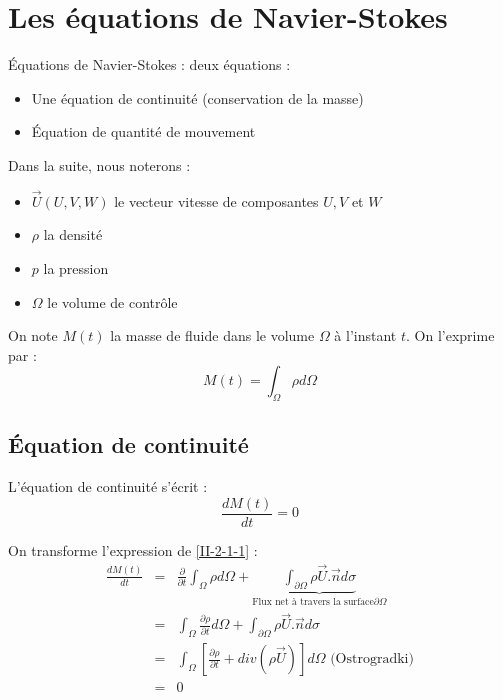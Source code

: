 \section{Les équations de Navier-Stokes}
Équations de Navier-Stokes : deux équations :
\begin{itemize}
	\item Une équation de continuité (conservation de la masse)
	\item Équation de quantité de mouvement
\end{itemize}

\bigskip
Dans la suite, nous noterons :
\begin{itemize}
	\item $\overrightarrow{U}(U,V,W)$ le vecteur vitesse de composantes $U, V$ et $W$
	\item $\rho$ la densité
	\item $p$ la pression
	\item $\Omega$ le volume de contrôle
\end{itemize}

\bigskip
On note $M(t)$ la masse de fluide dans le volume $\Omega$ à l'instant $t$. On l'exprime par :
	\begin{equation} \label{II-2} M(t)=\int_{\Omega} \rho d\Omega \end{equation}

	\subsection{Équation de continuité}
L'équation de continuité s'écrit :
	\begin{equation} \label{II-2-1-1} \frac{d M(t)}{dt}=0 \end{equation}

On transforme l'expression de \ref{II-2-1-1} :
\begin{eqnarray*}
	\frac{d M(t)}{dt}&=&\frac{\partial}{\partial t} \int_{\Omega} \rho d\Omega + \underbrace{\int_{\partial\Omega} \rho \overrightarrow{U}.\overrightarrow{n} d\sigma}_{\text{Flux net à travers la surface} \partial\Omega}\\
			&=& \int_{\Omega} \frac{\partial \rho}{\partial t} d\Omega + \int_{\partial \Omega} \rho \overrightarrow{U}.\overrightarrow{n} d\sigma \\
			&=& \int_{\Omega} \left[ \frac{\partial \rho}{\partial t} + div\left(\rho \overrightarrow{U}\right)\right] d\Omega \text{ (Ostrogradki)}\\
			&=& 0
\end{eqnarray*}

